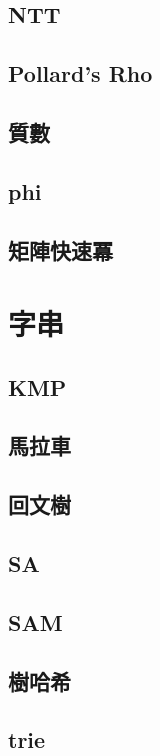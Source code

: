 \documentclass[a4paper,10pt,twocolumn,oneside]{article}
\begin{document}
\subsection{NTT}

\subsection{Pollard's Rho}

\subsection{質數}

\subsection{phi}

\subsection{矩陣快速冪}

\section{字串}
\subsection{KMP}

\subsection{馬拉車}

\subsection{回文樹}

\subsection{SA}

\subsection{SAM}

\subsection{樹哈希}

\subsection{trie}

\end{document}
